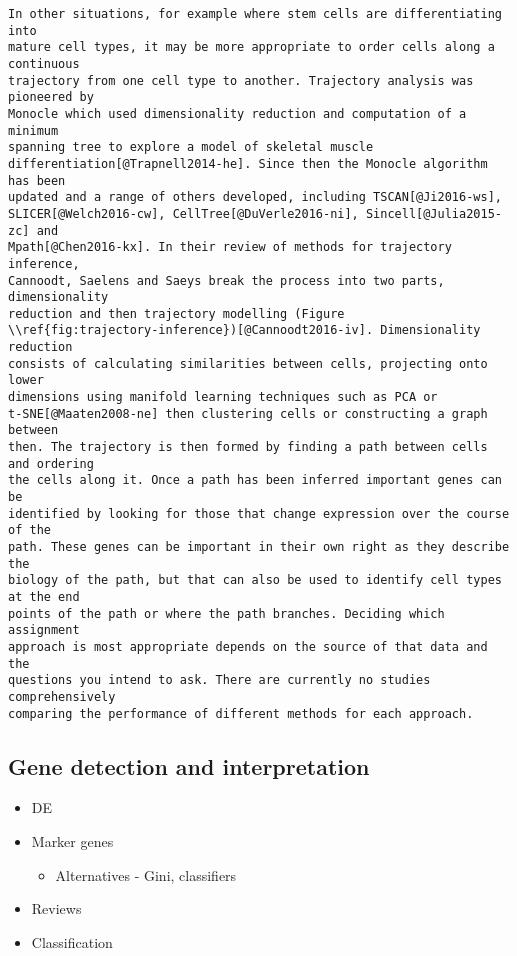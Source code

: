 \documentclass[11pt,a4paper,titlepage,twoside,openright]{style/unimelbthesis}
\theoremstyle{definition}
\theoremstyle{definition}
\theoremstyle{definition}
\theoremstyle{remark}
\begin{document}
\begin{mainmatter}
\begin{verbatim}
In other situations, for example where stem cells are differentiating into
mature cell types, it may be more appropriate to order cells along a continuous
trajectory from one cell type to another. Trajectory analysis was pioneered by
Monocle which used dimensionality reduction and computation of a minimum
spanning tree to explore a model of skeletal muscle
differentiation[@Trapnell2014-he]. Since then the Monocle algorithm has been
updated and a range of others developed, including TSCAN[@Ji2016-ws],
SLICER[@Welch2016-cw], CellTree[@DuVerle2016-ni], Sincell[@Julia2015-zc] and
Mpath[@Chen2016-kx]. In their review of methods for trajectory inference,
Cannoodt, Saelens and Saeys break the process into two parts, dimensionality
reduction and then trajectory modelling (Figure
\\ref{fig:trajectory-inference})[@Cannoodt2016-iv]. Dimensionality reduction
consists of calculating similarities between cells, projecting onto lower
dimensions using manifold learning techniques such as PCA or
t-SNE[@Maaten2008-ne] then clustering cells or constructing a graph between
then. The trajectory is then formed by finding a path between cells and ordering
the cells along it. Once a path has been inferred important genes can be
identified by looking for those that change expression over the course of the
path. These genes can be important in their own right as they describe the
biology of the path, but that can also be used to identify cell types at the end
points of the path or where the path branches. Deciding which assignment
approach is most appropriate depends on the source of that data and the
questions you intend to ask. There are currently no studies comprehensively
comparing the performance of different methods for each approach.
\end{verbatim}

\hypertarget{gene-detection-and-interpretation}{%
\subsection{Gene detection and interpretation}\label{gene-detection-and-interpretation}}

\begin{itemize}
\tightlist
\item
  DE
\item
  Marker genes

  \begin{itemize}
  \tightlist
  \item
    Alternatives - Gini, classifiers
  \end{itemize}
\item
  Reviews
\item
  Classification
\end{itemize}


\end{mainmatter}
\end{document}
